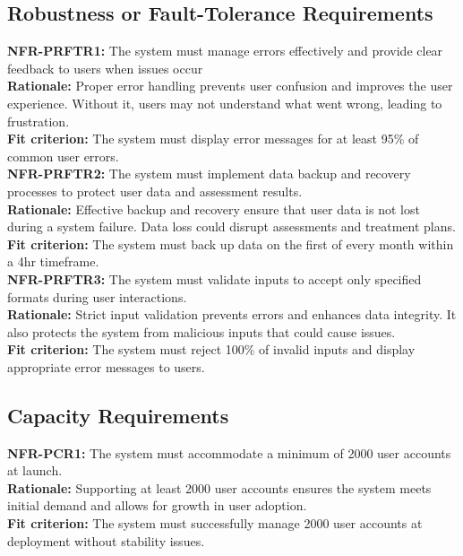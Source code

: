 \documentclass[12pt]{article}
\begin{document}
\subsection{Robustness or Fault-Tolerance Requirements}

\noindent\textbf{NFR-PRFTR1: }The system must manage errors effectively and provide clear feedback to users when issues occur\\
\textbf{Rationale: }Proper error handling prevents user confusion and improves the user experience. Without it, users may not understand what went wrong, leading to frustration.\\
\textbf{Fit criterion: }The system must display error messages for at least 95\% of common user errors.\\

\noindent\textbf{NFR-PRFTR2: }The system must implement data backup and recovery processes to protect user data and assessment results.\\
\textbf{Rationale: }Effective backup and recovery ensure that user data is not lost during a system failure. Data loss could disrupt assessments and treatment plans.\\
\textbf{Fit criterion: }The system must back up data on the first of every month within a 4hr timeframe.\\

\noindent\textbf{NFR-PRFTR3: }The system must validate inputs to accept only specified formats during user interactions.\\
\textbf{Rationale: }Strict input validation prevents errors and enhances data integrity. It also protects the system from malicious inputs that could cause issues.\\
\textbf{Fit criterion: }The system must reject 100\% of invalid inputs and display appropriate error messages to users.\\

\subsection{Capacity Requirements}

\noindent\textbf{NFR-PCR1: }The system must accommodate a minimum of 2000 user accounts at launch.\\
\textbf{Rationale: }Supporting at least 2000 user accounts ensures the system meets initial demand and allows for growth in user adoption.\\
\textbf{Fit criterion: }The system must successfully manage 2000 user accounts at deployment without stability issues.\\
\end{document}
